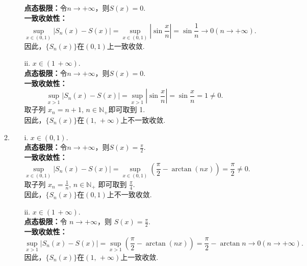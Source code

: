 \begin{enumerate}
\begin{solution}
\begin{enumerate}
\begin{enumerate}
        \textbf{点态极限：}令$n\to+\infty$，则$S(x)=0$.\\
        \textbf{一致收敛性：}
        \[
        \sup_{x\in(0,1)}\left|S_n(x)-S(x)\right|=\sup_{x\in(0,1)}\left|\sin\frac{x}{n}\right|=\sin\frac{1}{n}\to 0 (n\to +\infty).
        \]
        因此，$\{S_n(x)\}$在$(0,1)$上一致收敛.
        \item[ii.] $x\in(1\,+\infty).$\\
        \textbf{点态极限：}令$n\to+\infty$，则$S(x)=0$.\\
        \textbf{一致收敛性：}
        \[
        \sup_{x>1}\left|S_n(x)-S(x)\right|=\sup_{x>1}\left|\sin\frac{x}{n}\right|=\sin\frac{x}{n}=1\neq 0.
        \]
        取子列 $x_n=n+1,\,n\in\mathbb{N_{+}}$即可取到 1.\\
        因此，$\{S_n(x)\}$在$(1,\,+\infty)$上不一致收敛.
        \end{enumerate}

        \item 
        \begin{enumerate}
        \item[i.] $x\in(0,1).$\\
        \textbf{点态极限：}令$n\to+\infty$，则$S(x)=\frac{\pi}{2}$.\\
        \textbf{一致收敛性：}
        \[
        \sup_{x\in(0,1)}\left|S_n(x)-S(x)\right|=\sup_{x\in(0,1)}\left(\frac{\pi}{2}-\arctan(nx)\right)=\frac{\pi}{2}\neq 0.
        \]
        取子列 $\displaystyle x_n=\frac{1}{n},\,n\in\mathbb{N_{+}}$ 即可取到 $\displaystyle\frac{\pi}{4}$.\\
        因此，$\{S_n(x)\}$在$(0,1)$上不一致收敛.
        \item[ii.] $x\in(1\,+\infty).$\\
        \textbf{点态极限：}令 $n\to+\infty$，则 $\displaystyle S(x)=\frac{\pi}{2}$.\\
        \textbf{一致收敛性：}
        \[
        \sup_{x>1}\left|S_n(x)-S(x)\right|=\sup_{x>1}\left(\frac{\pi}{2}-\arctan(nx)\right)=\frac{\pi}{2}-\arctan{n}\to 0 (n\to+\infty).
        \]
        因此，$\{S_n(x)\}$在$(1,\,+\infty)$上一致收敛.
        \end{enumerate}


\end{enumerate}
\end{solution}
\end{enumerate}
